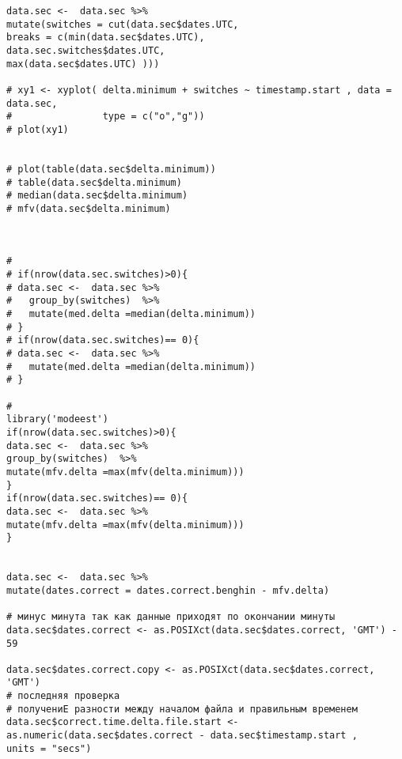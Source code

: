\begin{lstlisting}[language={Renhanced}]
data.sec <-  data.sec %>%
mutate(switches = cut(data.sec$dates.UTC, 
breaks = c(min(data.sec$dates.UTC),
data.sec.switches$dates.UTC,
max(data.sec$dates.UTC) )))

# xy1 <- xyplot( delta.minimum + switches ~ timestamp.start , data = data.sec,
#                type = c("o","g"))
# plot(xy1)


# plot(table(data.sec$delta.minimum))
# table(data.sec$delta.minimum)
# median(data.sec$delta.minimum)
# mfv(data.sec$delta.minimum)



# 
# if(nrow(data.sec.switches)>0){
# data.sec <-  data.sec %>%
#   group_by(switches)  %>%
#   mutate(med.delta =median(delta.minimum))
# }
# if(nrow(data.sec.switches)== 0){
# data.sec <-  data.sec %>%
#   mutate(med.delta =median(delta.minimum))
# }

# 
library('modeest')
if(nrow(data.sec.switches)>0){
data.sec <-  data.sec %>%
group_by(switches)  %>%
mutate(mfv.delta =max(mfv(delta.minimum)))
}
if(nrow(data.sec.switches)== 0){
data.sec <-  data.sec %>%
mutate(mfv.delta =max(mfv(delta.minimum)))
}


data.sec <-  data.sec %>%
mutate(dates.correct = dates.correct.benghin - mfv.delta)

# минус минута так как данные приходят по окончании минуты
data.sec$dates.correct <- as.POSIXct(data.sec$dates.correct, 'GMT') - 59

data.sec$dates.correct.copy <- as.POSIXct(data.sec$dates.correct, 'GMT')
# последняя проверка
# получениЕ разности между началом файла и правильным временем
data.sec$correct.time.delta.file.start <- as.numeric(data.sec$dates.correct - data.sec$timestamp.start ,
units = "secs")
\end{lstlisting}
%
%    





